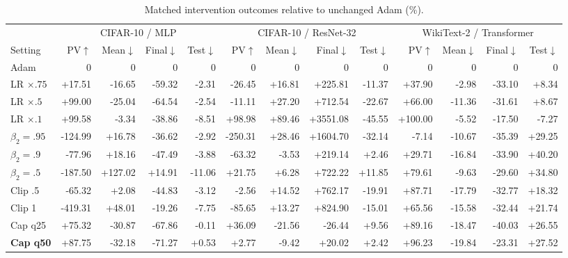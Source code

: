 \begin{table}[!t]
\caption{Matched intervention outcomes relative to unchanged Adam (\%).}
\label{tab:vc-outcomes}
\centering\fontsize{9}{10.5}\selectfont
\setlength{\tabcolsep}{3pt}
\renewcommand{\arraystretch}{1.06}
\begin{tabular}{lrrrrrrrrrrrr}
\toprule
 & \multicolumn{4}{c}{CIFAR-10 / MLP} & \multicolumn{4}{c}{CIFAR-10 / ResNet-32} & \multicolumn{4}{c}{WikiText-2 / Transformer} \\
\cmidrule(lr){2-5}\cmidrule(lr){6-9}\cmidrule(lr){10-13}
Setting & PV$\uparrow$ & Mean$\downarrow$ & Final$\downarrow$ & Test$\downarrow$ & PV$\uparrow$ & Mean$\downarrow$ & Final$\downarrow$ & Test$\downarrow$ & PV$\uparrow$ & Mean$\downarrow$ & Final$\downarrow$ & Test$\downarrow$ \\
\midrule
Adam & 0 & 0 & 0 & 0 & 0 & 0 & 0 & 0 & 0 & 0 & 0 & 0 \\
\addlinespace[2pt]
LR $\times .75$ & +17.51 & -16.65 & -59.32 & -2.31 & -26.45 & +16.81 & +225.81 & -11.37 & +37.90 & -2.98 & -33.10 & +8.34 \\
LR $\times .5$ & +99.00 & -25.04 & -64.54 & -2.54 & -11.11 & +27.20 & +712.54 & -22.67 & +66.00 & -11.36 & -31.61 & +8.67 \\
LR $\times .1$ & +99.58 & -3.34 & -38.86 & -8.51 & +98.98 & +89.46 & +3551.08 & -45.55 & +100.00 & -5.52 & -17.50 & -7.27 \\
\addlinespace[2pt]
$\beta_2=.95$ & -124.99 & +16.78 & -36.62 & -2.92 & -250.31 & +28.46 & +1604.70 & -32.14 & -7.14 & -10.67 & -35.39 & +29.25 \\
$\beta_2=.9$ & -77.96 & +18.16 & -47.49 & -3.88 & -63.32 & -3.53 & +219.14 & +2.46 & +29.71 & -16.84 & -33.90 & +40.20 \\
$\beta_2=.5$ & -187.50 & +127.02 & +14.91 & -11.06 & +21.75 & +6.28 & +722.22 & +11.85 & +79.61 & -9.63 & -29.60 & +34.80 \\
\addlinespace[2pt]
Clip .5 & -65.32 & +2.08 & -44.83 & -3.12 & -2.56 & +14.52 & +762.17 & -19.91 & +87.71 & -17.79 & -32.77 & +18.32 \\
Clip 1 & -419.31 & +48.01 & -19.26 & -7.75 & -85.65 & +13.27 & +824.90 & -15.01 & +65.56 & -15.58 & -32.44 & +21.74 \\
\addlinespace[2pt]
Cap q25 & +75.32 & -30.87 & -67.86 & -0.11 & +36.09 & -21.56 & -26.44 & +9.56 & +89.16 & -18.47 & -40.03 & +26.55 \\
\textbf{Cap q50} & +87.75 & -32.18 & -71.27 & +0.53 & +2.77 & -9.42 & +20.02 & +2.42 & +96.23 & -19.84 & -23.31 & +27.52 \\

\end{tabular}
\end{table}
